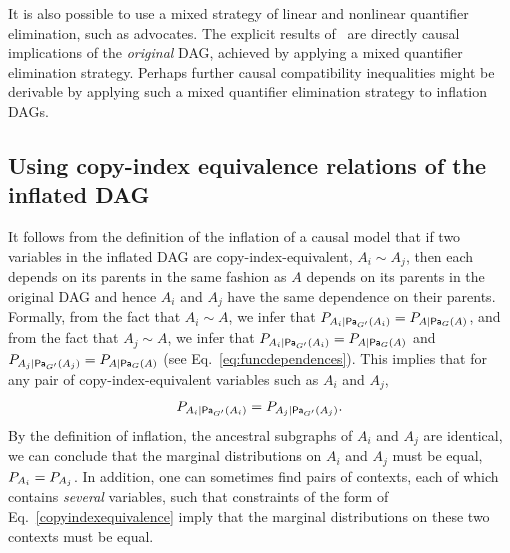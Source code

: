 It is also possible to use a mixed strategy of linear and nonlinear quantifier elimination, such as \citet{ChavesPolynomial} advocates. The explicit results of~\cite{ChavesPolynomial} are directly causal implications of the \emph{original} DAG, achieved by applying a mixed quantifier elimination strategy. Perhaps further causal compatibility inequalities might be derivable by applying such a mixed quantifier elimination strategy to inflation DAGs.

\subsection{Using copy-index equivalence relations of the inflated DAG}\label{Sec:copyindexequivalence}

It follows from the definition of the inflation of a causal model that if two variables in the inflated DAG are copy-index-equivalent, $A_i \sim A_j$, then each depends on its parents in the same fashion as $A$ depends on its parents in the original DAG and hence $A_i$ and $A_j$ have the same dependence on their parents.  Formally, from the fact that $A_i \sim A$, we infer that $\pfunc{A_i| \Pa[G']{A_i}}=\pfunc{A|\Pa[G]{A}}$, and from the fact that $A_j \sim A$, we infer that $\pfunc{A_i| \Pa[G']{A_i}}=\pfunc{A|\Pa[G]{A}}$ and $\pfunc{A_j| \Pa[G']{A_j}}=\pfunc{A|\Pa[G]{A}}$ (see Eq.~\eqref{eq:funcdependences}).  This implies that for any pair of copy-index-equivalent variables such as $A_i$ and $A_j$,
\begin{align}\label{copyindexequivalence}
\pfunc{A_i| \Pa[G']{A_i}}=\pfunc{A_j|\Pa[G']{A_j}}.
 \end{align}
By the definition of inflation, the ancestral subgraphs of $A_i$ and $A_j$ are identical, we can conclude that the marginal distributions on $A_i$ and $A_j$ must be equal, $ \pfunc{A_i}=\pfunc{A_j}$.
In addition, one can sometimes find pairs of contexts, each of which contains {\em several} variables, such that constraints of the form of Eq.~\eqref{copyindexequivalence} imply that the marginal distributions on these two contexts must be equal. 

